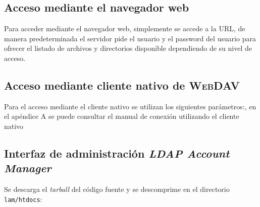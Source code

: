       \subsection {Acceso mediante el navegador web}

Para acceder mediante el navegador web, simplemente se accede a la URL, de manera predeterminada el servidor pide el usuario y el password del usuario para ofrecer el listado de  archivos y directorios disponible dependiendo de su nivel de acceso.

      \subsection {Acceso mediante cliente nativo de \textsc{WebDAV}}

Para el acceso mediante el cliente nativo se utilizan los siguientes par\'{a}metros:, en el ap\'{e}ndice A se puede consultar el manual de conexi\'{o}n utilizando el cliente nativo

{
 \begin{table}[H]
 \caption{Par\'{a}metros de conexi\'{o}n \texttt{WebDAV}}{}
 \label{tab:webdav-parameters}
 \noindent{} %
 \end{table}
}

%

      \subsection {Interfaz de administraci\'{o}n \textit{LDAP Account Manager}}

Se descarga el \textit{tarball} del c\'{o}digo fuente y se descomprime en el directorio \texttt{lam/htdocs}:

